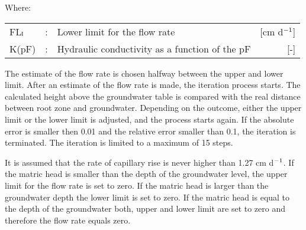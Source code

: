 Where:\\[5pt]
\begin{tabularx}{\textwidth}{llXr}
FL$_{{\rm l}}$ &:& Lower limit for the flow rate  & [cm d$^{{\rm -1}}$]\\
K(pF) &:& Hydraulic conductivity as a function of the pF  & [-]\\
\end{tabularx}

The estimate of the flow rate is chosen halfway between the upper and lower limit. After
an estimate of the flow rate is made, the iteration process starts. The calculated height
above the groundwater table is compared with the real distance between root zone and
groundwater. Depending on the outcome, either the upper limit or the lower limit is
adjusted, and the process starts again. If the absolute error is smaller then 0.01 and the
relative error smaller than 0.1, the iteration is terminated. The iteration is limited to a
maximum of 15 steps.

It is assumed that the rate of capillary rise is never higher than 1.27 cm d$^{{\rm -1}}$. If 
the matric
head is smaller than the depth of the groundwater level, the upper limit for the flow rate
is set to zero. If the matric head is larger than the groundwater depth the lower limit is
set to zero. If the matric head is equal to the depth of the groundwater both, upper and
lower limit are set to zero and therefore the flow rate equals zero.
